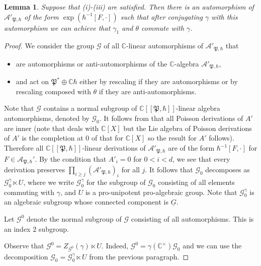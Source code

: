 \documentclass[12pt]{amsart}
\newcommand{\C}{\mathbb{C}}
\newcommand{\A}{\mathcal{A}}
\newcommand{\param}{\mathfrak{P}}
\newtheorem{Lem}[Thm]{Lemma}
\theoremstyle{definition}
\numberwithin{equation}{section}
\begin{document}
\begin{Lem}\label{Lem:action_conjugation}
Suppose that (i)-(iii) are satisfied. 
Then there is an automorphism of $\A'_{\param,\hbar}$ of the form $\exp(\hbar^{-1}[F,\cdot])$
such that after conjugating $\gamma$ with this automorphism we can achieve
that $\gamma_1$ and $\theta$ commute with $\gamma$.
\end{Lem}
\begin{proof}
We consider the group $\mathcal{G}$ of all $\C$-linear automorphisms
of $\A'_{\param,\hbar}$ that
\begin{itemize}
\item  are automorphisms or anti-automorphisms of the $\C$-algebra $\A'_{\param,\hbar}$,
\item and act on $\param^*\oplus \C\hbar$ either by rescaling if they are automorphisms or by rescaling composed with $\theta$
if they are anti-automorphisms.
\end{itemize}
Note that $\mathcal{G}$ contains a normal subgroup of $\C[[\param,\hbar]]$-linear algebra
automorphisms, denoted by $\mathcal{G}_0$. It follows from \cite[Proposition 2.14]{orbit}
that all Poisson derivations of $A'$ are inner (note that \cite[Proposition 2.14]{orbit} deals with $\C[X]$ but 
the Lie algebra of Poisson derivations of $A'$ is the completion at $0$ of that for $\C[X]$ so the result for 
$A'$ follows). Therefore
all $\C[[\param,\hbar]]$-linear derivations of $\A'_{\param,\hbar}$ are of the form $\hbar^{-1}[F,\cdot]$
for $F \in \A_{\param,\hbar}'$. By the condition that $A'_i=0$ for $0<i<d$, we see that
every derivation preserves $\prod_{i\geqslant j} (\A'_{\param,\hbar})_i$ for all $j$. It follows that
$\mathcal{G}_0$ decomposes as $\mathcal{G}_0^\gamma\ltimes U$, where
we write $\mathcal{G}_0^\gamma$ for the subgroup of $\mathcal{G}_0$ consisting of all
elements commuting with $\gamma$, and $U$ is a pro-unipotent pro-algebraic group.
Note that $\mathcal{G}_0^\gamma$ is an algebraic subgroup whose connected component is $\underline{G}$.

Let $\mathcal{G}^0$ denote the normal subgroup of $\mathcal{G}$ consisting of all automorphisms. This is an index $2$ subgroup. 

Observe that $\mathcal{G}^0=Z_{\mathcal{G}^0}(\gamma)\ltimes U$. Indeed, $\mathcal{G}^0=\gamma(\C^\times)\mathcal{G}_0$ and we can use the decomposition
$\mathcal{G}_0=\mathcal{G}_0^\gamma\ltimes U$ from the previous paragraph.


\end{proof}
\end{document}
